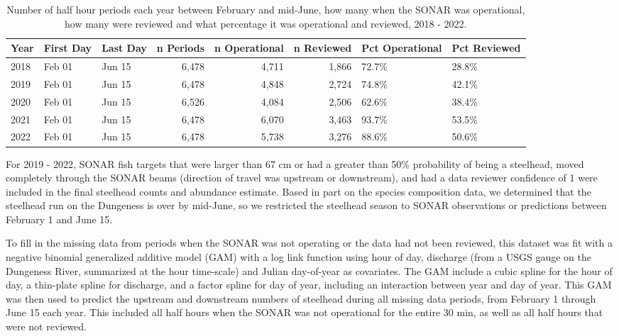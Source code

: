 \documentclass[
]{article}
\begin{document}
\begin{table}[!h]

\caption{\label{tab:pct-ops}Number of half hour periods each year between February and mid-June, how many when the SONAR was operational, how many were reviewed and what percentage it was operational and reviewed, 2018 - 2022.}
\centering
\begin{tabular}[t]{lllrrrll}
\toprule
Year & First Day & Last Day & n Periods & n Operational & n Reviewed & Pct Operational & Pct Reviewed\\
\midrule
2018 & Feb 01 & Jun 15 & 6,478 & 4,711 & 1,866 & 72.7\% & 28.8\%\\
2019 & Feb 01 & Jun 15 & 6,478 & 4,848 & 2,724 & 74.8\% & 42.1\%\\
2020 & Feb 01 & Jun 15 & 6,526 & 4,084 & 2,506 & 62.6\% & 38.4\%\\
2021 & Feb 01 & Jun 15 & 6,478 & 6,070 & 3,463 & 93.7\% & 53.5\%\\
2022 & Feb 01 & Jun 15 & 6,478 & 5,738 & 3,276 & 88.6\% & 50.6\%\\
\bottomrule
\end{tabular}
\end{table}

For 2019 - 2022, SONAR fish targets that were larger than 67 cm or had a greater than 50\% probability of being a steelhead, moved completely through the SONAR beams (direction of travel was upstream or downstream), and had a data reviewer confidence of 1 were included in the final steelhead counts and abundance estimate. Based in part on the species composition data, we determined that the steelhead run on the Dungeness is over by mid-June, so we restricted the steelhead season to SONAR observations or predictions between February 1 and June 15.

To fill in the missing data from periods when the SONAR was not operating or the data had not been reviewed, this dataset was fit with a negative binomial generalized additive model (GAM) with a log link function using hour of day, discharge (from a USGS gauge on the Dungeness River, summarized at the hour time-scale) and Julian day-of-year as covariates. The GAM include a cubic spline for the hour of day, a thin-plate spline for discharge, and a factor spline for day of year, including an interaction between year and day of year. This GAM was then used to predict the upstream and downstream numbers of steelhead during all missing data periods, from February 1 through June 15 each year. This included all half hours when the SONAR was not operational for the entire 30 min, as well as all half hours that were not reviewed.
\end{document}
